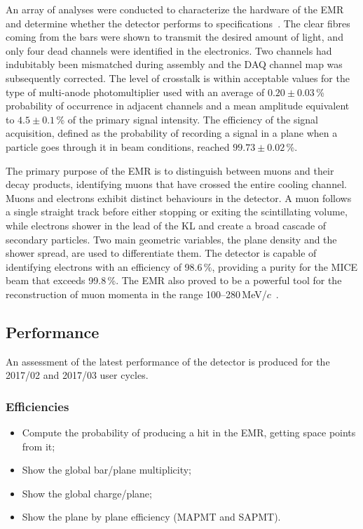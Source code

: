 An array of analyses were conducted to characterize the hardware of the EMR and determine whether the detector performs to specifications~\cite{Drielsma:2017doj}. The clear fibres coming from the bars were shown to transmit the desired amount of light, and only four dead channels were identified in the electronics. Two channels had indubitably been mismatched during assembly and the DAQ channel map was subsequently corrected. The level of crosstalk is within acceptable values for the type of multi-anode photomultiplier used with an average of $0.20\pm0.03$\,\% probability of occurrence in adjacent channels and a mean amplitude equivalent to $4.5\pm0.1$\,\% of the primary signal intensity. The efficiency of the signal acquisition, defined as the probability of recording a signal in a plane when a particle goes through it in beam conditions, reached $99.73\pm0.02$\,\%.

The primary purpose of the EMR is to distinguish between muons and their decay products, identifying
muons that have crossed the entire cooling channel. Muons and electrons exhibit distinct behaviours in the detector. A muon follows a single straight track before either stopping or exiting the scintillating volume, while electrons shower in the lead of the KL and create a broad cascade of secondary particles. Two main geometric variables, the plane density and the shower spread, are used to differentiate them. The detector is capable of identifying electrons with an efficiency of 98.6\,\%, providing a purity for the MICE beam that exceeds 99.8\,\%. The EMR also proved to be a powerful tool for the reconstruction of muon momenta in the range 100--280\,MeV/$c$~\cite{2015JInst..10P2012A}.

\subsection{Performance}
\label{SubSect:EMR_Performance}
An assessment of the latest performance of the detector is produced for the 2017/02 and 2017/03 user cycles.

\subsubsection{Efficiencies}
\begin{itemize}
	\item Compute the probability of producing a hit in the EMR, getting space points from it;
	\item Show the global bar/plane multiplicity;
	\item Show the global charge/plane;
	\item Show the plane by plane efficiency (MAPMT and SAPMT).
\end{itemize}

